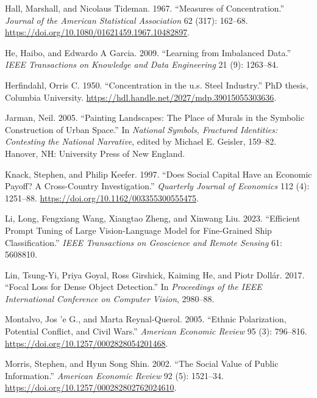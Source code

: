 \documentclass[
  a4paper,
]{article}
\newlength{\cslhangindent}
\newenvironment{CSLReferences}[2] %
 {\begin{list}{}{%
  \setlength{\itemindent}{0pt}
  \setlength{\leftmargin}{0pt}
  \setlength{\parsep}{0pt}
  \ifodd #1
   \setlength{\leftmargin}{\cslhangindent}
   \setlength{\itemindent}{-1\cslhangindent}
  \fi
  \setlength{\itemsep}{#2\baselineskip}}}
 {\end{list}}
\begin{document}
\begin{CSLReferences}{1}{0}
Hall, Marshall, and Nicolaus Tideman. 1967. {``Measures of
Concentration.''} \emph{Journal of the American Statistical Association}
62 (317): 162--68. \url{https://doi.org/10.1080/01621459.1967.10482897}.

He, Haibo, and Edwardo A Garcia. 2009. {``Learning from Imbalanced
Data.''} \emph{IEEE Transactions on Knowledge and Data Engineering} 21
(9): 1263--84.

Herfindahl, Orris C. 1950. {``Concentration in the u.s. Steel
Industry.''} PhD thesis, Columbia University.
\url{https://hdl.handle.net/2027/mdp.39015055303636}.

Jarman, Neil. 2005. {``Painting Landscapes: The Place of Murals in the
Symbolic Construction of Urban Space.''} In \emph{National Symbols,
Fractured Identities: Contesting the National Narrative}, edited by
Michael E. Geisler, 159--82. Hanover, NH: University Press of New
England.

Knack, Stephen, and Philip Keefer. 1997. {``Does Social Capital Have an
Economic Payoff? A Cross-Country Investigation.''} \emph{Quarterly
Journal of Economics} 112 (4): 1251--88.
\url{https://doi.org/10.1162/003355300555475}.

Li, Long, Fengxiang Wang, Xiangtao Zheng, and Xinwang Liu. 2023.
{``Efficient Prompt Tuning of Large Vision-Language Model for
Fine-Grained Ship Classification.''} \emph{IEEE Transactions on
Geoscience and Remote Sensing} 61: 5608810.

Lin, Tsung-Yi, Priya Goyal, Ross Girshick, Kaiming He, and Piotr Dollár.
2017. {``Focal Loss for Dense Object Detection.''} In \emph{Proceedings
of the IEEE International Conference on Computer Vision}, 2980--88.

Montalvo, Jos 'e G., and Marta Reynal-Querol. 2005. {``Ethnic
Polarization, Potential Conflict, and Civil Wars.''} \emph{American
Economic Review} 95 (3): 796--816.
\url{https://doi.org/10.1257/0002828054201468}.

Morris, Stephen, and Hyun Song Shin. 2002. {``The Social Value of Public
Information.''} \emph{American Economic Review} 92 (5): 1521--34.
\url{https://doi.org/10.1257/000282802762024610}.


\end{CSLReferences}
\end{document}
